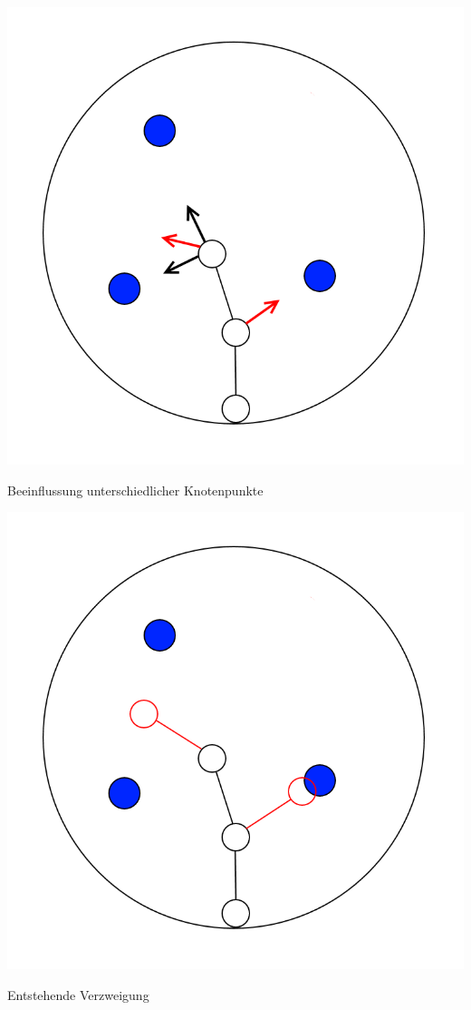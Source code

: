 \newpage
\begin{center}
	\includegraphics[height=.9\textheight]{images/CH3_SCA_Basic7.png}
	
	Beeinflussung unterschiedlicher Knotenpunkte
\end{center}




\newpage
\begin{center}
	\includegraphics[height=.9\textheight]{images/CH3_SCA_Basic8.png}
	
	Entstehende Verzweigung
\end{center}




